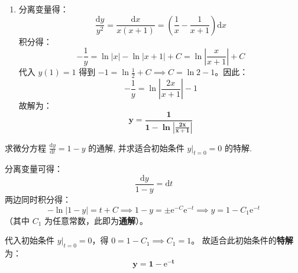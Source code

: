 \documentclass[lang=cn,11pt]{elegantbook}
\begin{document}
\begin{solution}
\begin{enumerate}
    \item[(8)] 分离变量得：
    \[
    \frac{\mathrm{d}y}{y^2} = \frac{\mathrm{d}x}{x(x+1)} = \left(\frac{1}{x}-\frac{1}{x+1}\right)\mathrm{d}x
    \]
    积分得：
    \[
    -\frac{1}{y} = \ln|x| - \ln|x+1| + C = \ln\left|\frac{x}{x+1}\right| + C
    \]
    代入 $y(1)=1$ 得到 $-1 = \ln\frac{1}{2} + C \implies C = \ln 2 - 1$。因此：
    \[
    -\frac{1}{y} = \ln\left|\frac{2x}{x+1}\right| - 1
    \]
    故解为：
    \[
    \mathbf{y = \frac{1}{1-\ln\left|\frac{2x}{x+1}\right|}}
    \]
\end{enumerate}
\end{solution}

\begin{exercise}[求解方程]
求微分方程 $\displaystyle \frac{\mathrm{d}y}{\mathrm{d}t}=1-y$ 的通解, 并求适合初始条件 $y\big|_{t=0}=0$ 的特解.
\end{exercise}
\begin{solution}
分离变量可得：
\[
\frac{\mathrm{d}y}{1-y} = \mathrm{d}t
\]
两边同时积分得：
\[
-\ln|1-y| = t + C \implies 1-y = \pm\mathrm{e}^{-C}\mathrm{e}^{-t} \implies y = 1 - C_1\mathrm{e}^{-t}
\]
（其中 $C_1$ 为任意常数，此即为\textbf{通解}）。

代入初始条件 $y\big|_{t=0} = 0$，得 $0 = 1 - C_1 \implies C_1 = 1$。
故适合此初始条件的\textbf{特解}为：
\[
\mathbf{y = 1 - \mathrm{e}^{-t}}
\]
\end{solution}
\end{document}
